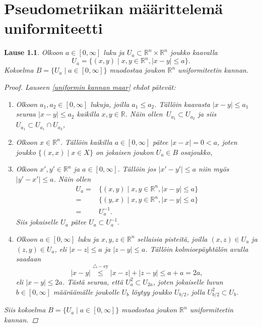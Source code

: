 \documentclass[12pt,a4paper,leqno]{report}
\newcommand{\R}{\mathbb{R}}
\theoremstyle{plain}
\newtheorem{lause}[equation]{Lause}
\theoremstyle{definition}
\theoremstyle{remark}
\begin{document}
\chapter{Pseudometriikan määrittelemä uniformiteetti}\label{luku_pseudo_uniformi}
\begin{lause}
Olkoon $a\in[0,\infty]$ luku ja $U_a\subset \R^n\times\R^n$ joukko kaavalla
$$U_a=\{ (x,y)\mid x,y\in\R^n,|x-y|\leq a\}.$$
Kokoelma $B=\{U_a\mid a\in[0,\infty]\}$ muodostaa joukon $\R^n$ uniformiteetin kannan.
\begin{proof}
Lauseen \ref{uniformin kannan maar} ehdot pätevät:
\begin{enumerate} [label=(B\arabic*)]
\item %
Olkoon $a_1,a_2\in[0,\infty]$ lukuja, joilla $a_1\leq a_2$. Tällöin kaavasta $|x-y|\leq a_1$ seuraa $|x-y|\leq a_2$ kaikilla $x,y\in\R$. Näin ollen $\, U_{a_1}\subset U_{a_2}$ ja siis $U_{a_1}\subset U_{a_1}\cap U_{a_2}$,
\item%
Olkoon $x\in\R^n$. Tällöin kaikilla $a\in[0,\infty]$ pätee $|x-x|=0< a$, joten joukko $\{(x,x)\mid x\in X\}$ on jokaisen joukon $U_a\in B$ osajoukko,
\item%
Olkoon $x',y'\in\R^n$ ja $a\in[0,\infty]$. Tällöin jos $|x'-y'|\leq a$ niin myös $|y'-x'|\leq a$. Näin ollen 
\begin{align*}
U_a=&\{ (x,y)\mid x,y\in\R^n,|x-y|\leq a\}\\
=&\{ (y,x)\mid x,y\in\R^n,|x-y|\leq a\}\\
=&U_a^{-1}.
\end{align*}
Siis jokaiselle $U_a$ pätee $U_a\subset  U_a^{-1}. $
\item%
Olkoon $a\in[0,\infty]$ luku ja $x,y,z\in\R^n$ sellaisia pisteitä, joilla $(x,z)\in U_a$ ja $(z,y)\in U_a$, eli $|x-z|\leq a$ ja $|z-y|\leq a$.
Tällöin kolmioepäyhtälön avulla saadaan 
$$|x-y|\stackrel{\triangle-\text{ey} }{\leq} |x-z|+|z-y|\leq a+a=2a,$$ 
eli $|x-y|\leq 2a$. Tästä seuraa, että $ U_a^2\subset U_{2a} $, joten jokaiselle luvun $b\in[0,\infty]$ määräämälle joukolle $U_b$ löytyy joukko $U_{b/2}$, jolla $U_{b/2}^2\subset U_b$.
\end{enumerate}
Siis kokoelma $B=\{U_a\mid a\in[0,\infty]\}$ muodostaa joukon $\R^n$ uniformiteetin kannan.
\end{proof}
\end{lause}
\end{document}
